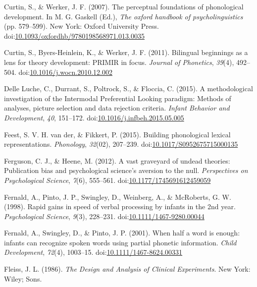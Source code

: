 \documentclass[man]{apa6}
\theoremstyle{definition}
\theoremstyle{definition}
\theoremstyle{definition}
\theoremstyle{remark}
\begin{document}
\hypertarget{ref-Curtin2007}{}
Curtin, S., \& Werker, J. F. (2007). The perceptual foundations of
phonological development. In M. G. Gaskell (Ed.), \emph{The oxford
handbook of psycholinguistics} (pp. 579--599). New York: Oxford
University Press.
doi:\href{https://doi.org/10.1093/oxfordhb/9780198568971.013.0035}{10.1093/oxfordhb/9780198568971.013.0035}

\hypertarget{ref-Curtin2011}{}
Curtin, S., Byers-Heinlein, K., \& Werker, J. F. (2011). Bilingual
beginnings as a lens for theory development: PRIMIR in focus.
\emph{Journal of Phonetics}, \emph{39}(4), 492--504.
doi:\href{https://doi.org/10.1016/j.wocn.2010.12.002}{10.1016/j.wocn.2010.12.002}

\hypertarget{ref-DelleLuche2015}{}
Delle Luche, C., Durrant, S., Poltrock, S., \& Floccia, C. (2015). A
methodological investigation of the Intermodal Preferential Looking
paradigm: Methods of analyses, picture selection and data rejection
criteria. \emph{Infant Behavior and Development}, \emph{40}, 151--172.
doi:\href{https://doi.org/10.1016/j.infbeh.2015.05.005}{10.1016/j.infbeh.2015.05.005}

\hypertarget{ref-vanderFeest2015}{}
Feest, S. V. H. van der, \& Fikkert, P. (2015). Building phonological
lexical representations. \emph{Phonology}, \emph{32}(02), 207--239.
doi:\href{https://doi.org/10.1017/S0952675715000135}{10.1017/S0952675715000135}

\hypertarget{ref-Ferguson2012}{}
Ferguson, C. J., \& Heene, M. (2012). A vast graveyard of undead
theories: Publication bias and psychological science's aversion to the
null. \emph{Perspectives on Psychological Science}, \emph{7}(6),
555--561.
doi:\href{https://doi.org/10.1177/1745691612459059}{10.1177/1745691612459059}

\hypertarget{ref-Fernald1998}{}
Fernald, A., Pinto, J. P., Swingley, D., Weinberg, A., \& McRoberts, G.
W. (1998). Rapid gains in speed of verbal processing by infants in the
2nd year. \emph{Psychological Science}, \emph{9}(3), 228--231.
doi:\href{https://doi.org/10.1111/1467-9280.00044}{10.1111/1467-9280.00044}

\hypertarget{ref-Fernald2001a}{}
Fernald, A., Swingley, D., \& Pinto, J. P. (2001). When half a word is
enough: infants can recognize spoken words using partial phonetic
information. \emph{Child Development}, \emph{72}(4), 1003--15.
doi:\href{https://doi.org/10.1111/1467-8624.00331}{10.1111/1467-8624.00331}

\hypertarget{ref-Fleiss1986}{}
Fleiss, J. L. (1986). \emph{The Design and Analysis of Clinical
Experiments}. New York: Wiley; Sons.
\end{document}
